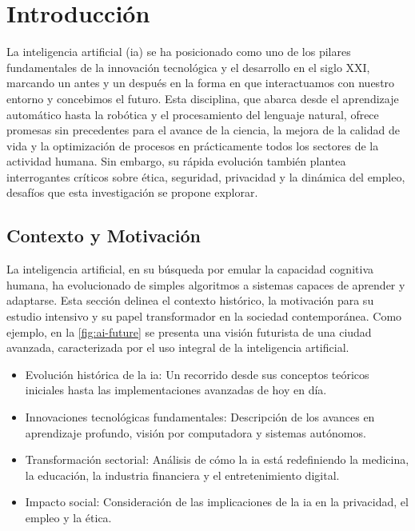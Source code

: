 \chapter{Introducción}

La inteligencia artificial (\acrshort{ia}) se ha posicionado como uno de los pilares fundamentales de la innovación tecnológica y el desarrollo en el siglo XXI, marcando un antes y un después en la forma en que interactuamos con nuestro entorno y concebimos el futuro. Esta disciplina, que abarca desde el aprendizaje automático hasta la robótica y el procesamiento del lenguaje natural, ofrece promesas sin precedentes para el avance de la ciencia, la mejora de la calidad de vida y la optimización de procesos en prácticamente todos los sectores de la actividad humana. Sin embargo, su rápida evolución también plantea interrogantes críticos sobre ética, seguridad, privacidad y la dinámica del empleo, desafíos que esta investigación se propone explorar.

\section{Contexto y Motivación}

La inteligencia artificial, en su búsqueda por emular la capacidad cognitiva humana, ha evolucionado de simples \glspl{algoritmo} a sistemas capaces de aprender y adaptarse. Esta sección delinea el contexto histórico, la motivación para su estudio intensivo y su papel transformador en la sociedad contemporánea. Como ejemplo, en la \autoref{fig:ai-future} se presenta una visión futurista de una ciudad avanzada, caracterizada por el uso integral de la inteligencia artificial.

\begin{itemize}
    \item Evolución histórica de la \acrshort{ia}: Un recorrido desde sus conceptos teóricos iniciales hasta las implementaciones avanzadas de hoy en día.
    \item Innovaciones tecnológicas fundamentales: Descripción de los avances en aprendizaje profundo, visión por computadora y sistemas autónomos.
    \item Transformación sectorial: Análisis de cómo la \acrshort{ia} está redefiniendo la medicina, la educación, la industria financiera y el entretenimiento digital.
    \item Impacto social: Consideración de las implicaciones de la \acrshort{ia} en la privacidad, el empleo y la ética.
\end{itemize}

